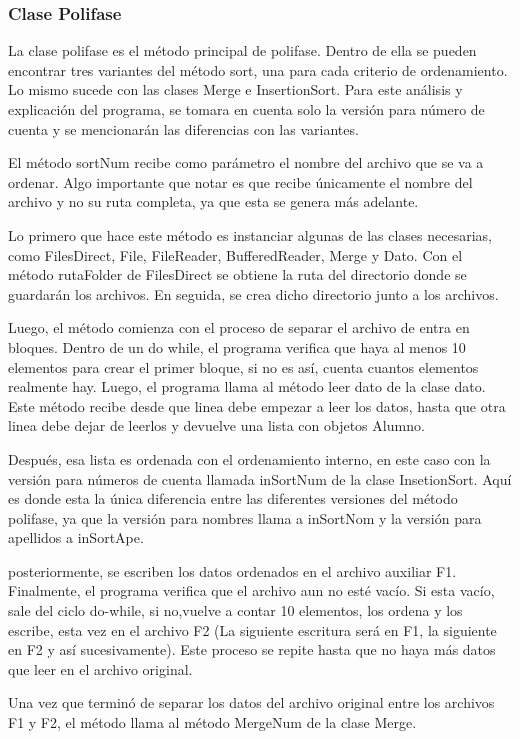\documentclass[11pt]{article}
\begin{document}
\subsubsection{Clase Polifase}
La clase polifase es el método principal de polifase. Dentro de ella se pueden encontrar tres variantes del método sort, una para cada criterio de ordenamiento. Lo mismo sucede con las clases Merge e InsertionSort. Para este análisis y explicación del programa, se tomara en cuenta solo la versión para número de cuenta y se mencionarán las diferencias con las variantes.
\par
El método sortNum recibe como parámetro el nombre del archivo que se va a ordenar. Algo importante que notar es que recibe únicamente el nombre del archivo y no su ruta completa, ya que esta se genera más adelante. 
\par
Lo primero que hace este método es instanciar algunas de las clases necesarias, como FilesDirect, File, FileReader, BufferedReader, Merge y Dato. Con el método rutaFolder de FilesDirect se obtiene la ruta del directorio donde se guardarán los archivos. En seguida, se crea dicho directorio junto a los archivos.
\par
Luego, el método comienza con el proceso de separar el archivo de entra en bloques. Dentro de un do while, el programa verifica que haya al menos 10 elementos para crear el primer bloque, si no es así, cuenta cuantos elementos realmente hay. Luego, el programa llama al método leer dato de la clase dato. Este método recibe desde que linea debe empezar a leer los datos, hasta que otra linea debe dejar de leerlos y devuelve una lista con objetos Alumno.
\par
Después, esa lista es ordenada con el ordenamiento interno, en este caso con la versión para números de cuenta llamada inSortNum de la clase InsetionSort. Aquí es donde esta la única diferencia entre las diferentes versiones del método polifase, ya que la versión para nombres llama a inSortNom y la versión para apellidos a inSortApe.
\par
posteriormente, se escriben los datos ordenados en el archivo auxiliar F1. Finalmente, el programa verifica que el archivo aun no esté vacío. Si esta vacío, sale del ciclo do-while, si no,vuelve a contar 10 elementos, los ordena y los escribe, esta vez en el archivo F2 (La siguiente escritura será en F1, la siguiente en F2 y así sucesivamente). Este proceso se repite hasta que no haya más datos que leer en el archivo original.
\par
Una vez que terminó de separar los datos del archivo original entre los archivos F1 y F2, el método llama al método MergeNum de la clase Merge.
\end{document}
